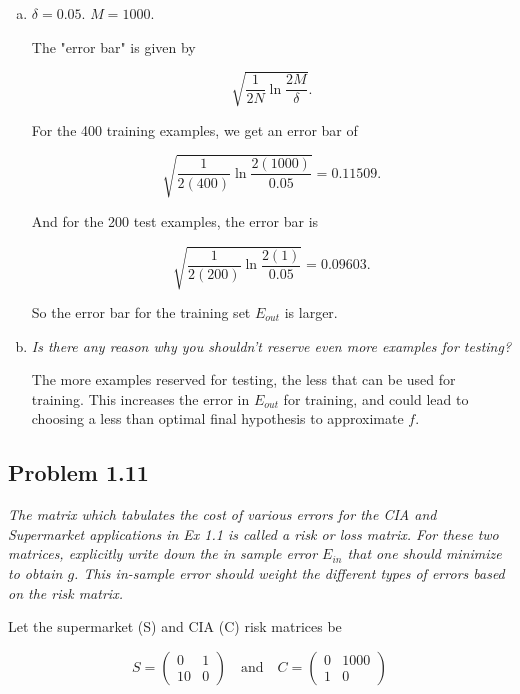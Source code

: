 \documentclass{article}
\begin{document}
\begin{enumerate}[(a)]
  \item $\delta = 0.05$. $M = 1000$.
    
    The "error bar" is given by 

    $$\sqrt{\frac{1}{2N}\ln\frac{2M}{\delta}}.$$

    For the 400 training examples, we get an error bar of

    $$\sqrt{\frac{1}{2(400)}\ln\frac{2(1000)}{0.05}} = 0.11509.$$

    And for the 200 test examples, the error bar is
    
    $$\sqrt{\frac{1}{2(200)}\ln\frac{2(1)}{0.05}} = 0.09603.$$

    So the error bar for the training set $E_{out}$ is larger.

  \item \textit{Is there any reason why you shouldn't reserve even more examples for testing?}

    The more examples reserved for testing, the less that can be used for training. This
    increases the error in $E_{out}$ for training, and could lead to choosing a less than
    optimal final hypothesis to approximate $f$. 

\end{enumerate}


\subsection*{Problem 1.11}

\textit{The matrix which tabulates the cost of various errors for the CIA and Supermarket applications in Ex 1.1 is called a risk or loss matrix. For these two matrices, explicitly write down the in sample error $E_{in}$ that one should minimize to obtain $g$. This in-sample error should weight the different types of errors based on the risk matrix.}

\smallskip

Let the supermarket (S) and CIA (C) risk matrices be 

\[ 
  S =
  \begin{pmatrix}
    0 & 1 \\
    10 & 0
  \end{pmatrix}
  \quad \text{and} \quad
  C =
  \begin{pmatrix}
    0 & 1000 \\
    1 & 0
  \end{pmatrix}
\]
\end{document}
